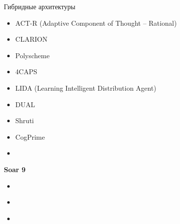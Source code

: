 \documentclass{beamer}
\begin{document}
\begin{frame}{Гибридные архитектуры}
\begin{itemize}
	\item ACT-R (Adaptive Component of Thought -- Rational)
	\item CLARION
	\item Polyscheme
	\item 4CAPS
	\item LIDA (Learning Intelligent Distribution Agent)
	\item DUAL
	\item Shruti
	\item CogPrime
\end{itemize}
\end{frame}

\begin{frame}{}
\begin{itemize}
	\item 
	\medskip
\end{itemize}
\end{frame}

%
%

\begin{frame}{}
\begin{center}
	\textbf{Soar 9}
\end{center}
\end{frame}

\begin{frame}{}
\begin{itemize}
	\item 
	\medskip
\end{itemize}
\end{frame}

\begin{frame}{}
\begin{itemize}
	\item 
	\medskip
\end{itemize}
\end{frame}

\begin{frame}{}
\begin{itemize}
	\item 
	\medskip
\end{itemize}
\end{frame}
\end{document}
